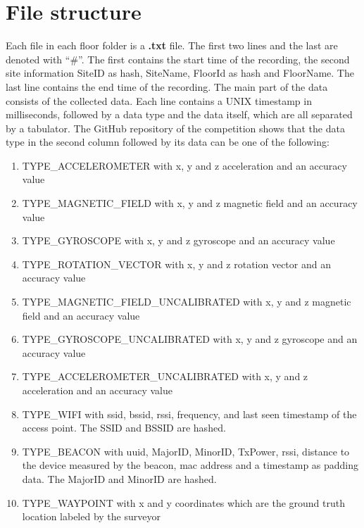 \section{File structure}\label{sec:file-structure}

Each file in each floor folder is a \textbf{.txt} file. 
The first two lines and the last are denoted with ``\#''.
The first contains the start time of the recording, the second site information SiteID as hash, SiteName, FloorId as hash and FloorName.
The last line contains the end time of the recording.
The main part of the data consists of the collected data. 
Each line contains a UNIX timestamp in milliseconds, followed by a data type and the data itself, which are all separated by a tabulator.
The GitHub repository of the competition\cite{GitHubComp} shows that the data type in the second column followed by its data can be one of the following:

\begin{enumerate}
    \item\label{type:acce} TYPE\_ACCELEROMETER with x, y and z acceleration and an accuracy value
    \item\label{type:mag} TYPE\_MAGNETIC\_FIELD with x, y and z magnetic field and an accuracy value
    \item\label{type:gyro} TYPE\_GYROSCOPE with x, y and z gyroscope and an accuracy value
    \item\label{type:rot} TYPE\_ROTATION\_VECTOR with x, y and z rotation vector and an accuracy value
    \item\label{type:mag_u} TYPE\_MAGNETIC\_FIELD\_UNCALIBRATED with x, y and z magnetic field and an accuracy value
    \item\label{type:gyro_u} TYPE\_GYROSCOPE\_UNCALIBRATED with x, y and z gyroscope and an accuracy value
    \item\label{type:acce_u} TYPE\_ACCELEROMETER\_UNCALIBRATED with x, y and z acceleration and an accuracy value
    \item\label{type:wifi} TYPE\_WIFI with \ac{ssid}, \ac{bssid}, \ac{rssi}, frequency, and last seen timestamp of the access point. The SSID and BSSID are hashed.
    \item\label{type:beacon} TYPE\_BEACON with \ac{uuid}, \ac{MajorID}, \ac{MinorID}, \ac{TxPower}, \ac{rssi}, distance to the device measured by the beacon, \ac{mac} address and a timestamp as padding data. The MajorID and MinorID are hashed.
    \item\label{type:way} TYPE\_WAYPOINT with x and y coordinates which are the ground truth location labeled by the surveyor
\end{enumerate}

